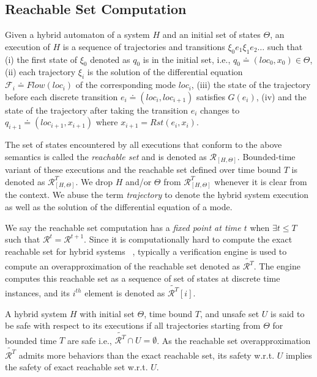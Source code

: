 \subsection{Reachable Set Computation}

\begin{definition}

Given a hybrid automaton of a system $H$ and an initial set of states $\Theta$, an execution of $H$ is a sequence of trajectories and transitions $\xi_0 e_1 \xi_1 e_2 \ldots $ such that
%
(i) the first state of $\xi_0$ denoted as $q_0$ is in the initial set, i.e., $q_0 \doteq (loc_0, x_0)\in \Theta$,
%
(ii) each trajectory $\xi_i$ is the solution of the differential equation $\mathcal{F}_i \doteq Flow (loc_i)$ of the corresponding mode $loc_i$, 
%
(iii) the state of the trajectory before each discrete transition $e_i \doteq (loc_i, loc_{i+1})$ satisfies $G(e_i)$,
%
(iv) and the state of the trajectory after taking the transition $e_i$ changes to $q_{i+1} \doteq (loc_{i+1}, x_{i+1})$ where $x_{i+1} = Rst (e_i, x_i)$.
\end{definition}
%
The set of states encountered by all executions that conform to the above semantics is called the \emph{reachable set} and is denoted as $\mathcal{R}_{[H, \Theta]}$. Bounded-time variant of these executions and the reachable set defined over time bound $T$ is denoted as $\mathcal{R}_{[H, \Theta]}^T$. We drop $H$ and/or $\Theta$ from $\mathcal{R}_{[H, \Theta]}^T$ whenever it is clear from the context. We abuse the term \emph{trajectory} to denote the hybrid system execution as well as the solution of the differential equation of a mode.

We say the reachable set computation has a \emph{fixed point at time $t$} when $\exists t \leq T$ such that $\mathcal{R}^t = \mathcal{R}^{t+1}$.
Since it is computationally hard to compute the exact reachable set for hybrid systems ~\cite{ALUR19953,10.1007/3-540-46430-1_6}, typically a verification engine is used to compute an overapproximation of the reachable set denoted as $\tilde{\mathcal{R}^T}$. The engine computes this reachable set as a sequence of set of states at discrete time instances, and its  $i^{th}$ element is denoted as $\tilde{\mathcal{R}^T}[i]$.

\vspace{0.2cm}
\begin{definition}
\label{def:hybridSafe}
A hybrid system $H$ with initial set $\Theta$, time bound $T$, and unsafe set $U$ is said to be safe with respect to its executions if all trajectories starting from $\Theta$ for bounded time $T$ are safe i.e., $\tilde{\mathcal{R}^T} \cap U = \emptyset$. As the reachable set overapproximation $\tilde{\mathcal{R}^T}$ admits  more behaviors than the exact reachable set, its safety w.r.t. $U$ implies the safety of exact reachable set w.r.t. $U$.
\end{definition}

